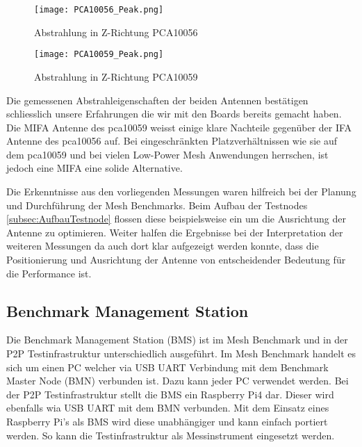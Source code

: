 \begin{figure}[!htbp]
\centering
\begin{minipage}[b]{0.49\linewidth}
	\centering
	\texttt{[image: PCA10056\_Peak.png]}
	\caption{Abstrahlung in Z-Richtung PCA10056}
	\label{fig:PCA10056Peak}
\end{minipage}
\begin{minipage}[b]{0.49\linewidth}
	\centering
	\texttt{[image: PCA10059\_Peak.png]}
	\caption{Abstrahlung in Z-Richtung PCA10059}
	\label{fig:PCA10059Peak}
\end{minipage}
\end{figure}

Die gemessenen Abstrahleigenschaften der beiden Antennen bestätigen schliesslich unsere Erfahrungen die wir mit den Boards bereits gemacht haben. Die MIFA Antenne des pca10059 weisst einige klare Nachteile gegenüber der IFA Antenne des pca10056 auf. Bei eingeschränkten Platzverhältnissen wie sie auf dem pca10059 und bei vielen Low-Power Mesh Anwendungen herrschen, ist jedoch eine MIFA eine solide Alternative.

Die Erkenntnisse aus den vorliegenden Messungen waren hilfreich bei der Planung und Durchführung der Mesh Benchmarks. Beim Aufbau der Testnodes \ref{subsec:AufbauTestnode} flossen diese beispielsweise ein um die Ausrichtung der Antenne zu optimieren. Weiter halfen die Ergebnisse bei der Interpretation der weiteren Messungen da auch dort klar aufgezeigt werden konnte, dass die Positionierung und Ausrichtung der Antenne von entscheidender Bedeutung für die Performance ist.

\subsection{Benchmark Management Station}\label{subsec:BenchmarkManagementStation}

Die Benchmark Management Station (BMS) ist im Mesh Benchmark und in der P2P Testinfrastruktur unterschiedlich ausgeführt. Im Mesh Benchmark handelt es sich um einen PC welcher via USB UART Verbindung mit dem Benchmark Master Node (BMN) verbunden ist. Dazu kann jeder PC verwendet werden.
Bei der P2P Testinfrastruktur stellt die BMS ein Raspberry Pi4 dar. Dieser wird ebenfalls wia USB UART mit dem BMN verbunden. Mit dem Einsatz eines Raspberry Pi's als BMS wird diese unabhängiger und kann einfach portiert werden. So kann die Testinfrastruktur als Messinstrument eingesetzt werden.

